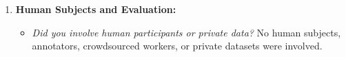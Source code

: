 \documentclass[11pt]{article}
\begin{document}
\begin{enumerate}
\begin{itemize}
    \end{itemize}
    \item \textbf{Human Subjects and Evaluation:}
    \begin{itemize}
        \setlength{\itemsep}{0pt}
        \item \textit{Did you involve human participants or private data?} No human subjects, annotators, crowdsourced workers, or private datasets were involved.
    \end{itemize}
\end{enumerate}
\end{document}
